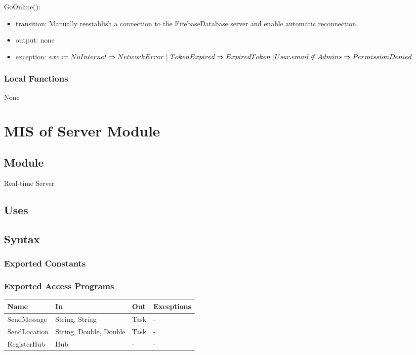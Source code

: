 \documentclass[12pt, titlepage]{article}
\begin{document}
\noindent GoOnline():
\begin{itemize}
\item transition: Manually reestablish a connection to the FirebaseDatabase server and enable automatic reconnection.
\item output: none
\item exception: $exc := NoInternet \Rightarrow NetworkError\ | \ TokenExpired \Rightarrow ExpiredToken\ | \\ User.email \notin Admins \Rightarrow PermissionDenied$
\end{itemize}

\subsubsection{Local Functions}

None

\newpage

\section{MIS of Server Module} \label{mServer}

\subsection{Module}

Real-time Server

\subsection{Uses}

\subsection{Syntax}

\subsubsection{Exported Constants}

\subsubsection{Exported Access Programs}

\begin{center}
\begin{tabular}{p{4cm} p{4cm} p{4cm} p{2cm}}
\hline
\textbf{Name} & \textbf{In} & \textbf{Out} & \textbf{Exceptions} \\
\hline
SendMessage & String, String & Task & - \\
SendLocation & String, Double, Double & Task & - \\
RegisterHub & Hub & - & - \\

\hline
\end{tabular}
\end{center}
\end{document}
